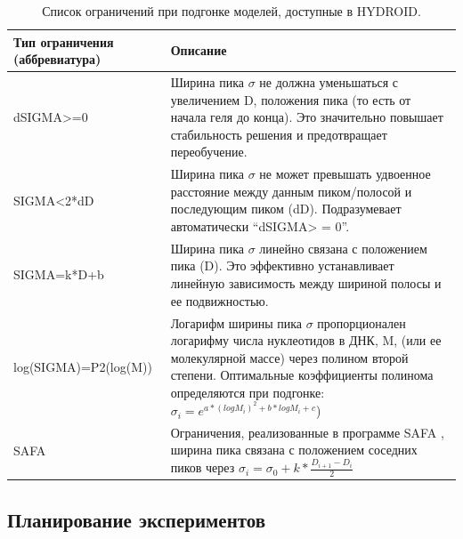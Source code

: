 \begin{table}[h!]
    \centering
    \begin{tabularx}{\textwidth}{|X|X|}
        \hline
        Тип ограничения (аббревиатура) & Описание \\
        \hline
        dSIGMA>=0 & Ширина пика $\sigma$ не должна уменьшаться с увеличением D, положения пика (то есть от начала геля до конца). Это значительно повышает стабильность решения и предотвращает переобучение. \\
        \hline
        SIGMA<2*dD & Ширина пика $\sigma$ не может превышать удвоенное расстояние между данным пиком/полосой и последующим пиком (dD). Подразумевает автоматически ``dSIGMA> = 0''. \\
        \hline
        SIGMA=k*D+b & Ширина пика $\sigma$ линейно связана с положением пика (D). Это эффективно устанавливает линейную зависимость между шириной полосы и ее подвижностью. \\
        \hline
        log(SIGMA)=P2(log(M)) & Логарифм ширины пика $\sigma$ пропорционален логарифму числа нуклеотидов в ДНК, M, (или ее молекулярной массе) через полином второй степени. Оптимальные коэффициенты полинома определяются при подгонке: $\sigma_i = e^{a*(log M_i)^2 +b* log M_i +c}$) \\
        \hline
        SAFA & Ограничения, реализованные в программе SAFA \cite{das_safa_2005}, ширина пика связана с положением соседних пиков через $\sigma_i = \sigma_0 + k * \frac{D_{i + 1}-D_i}{2}$\\
        \hline
    \end{tabularx}
    \caption{Список ограничений при подгонке моделей, доступные в HYDROID.}
    \label{tab:p5_t2}
\end{table}


\subsection{Планирование экспериментов}
    
